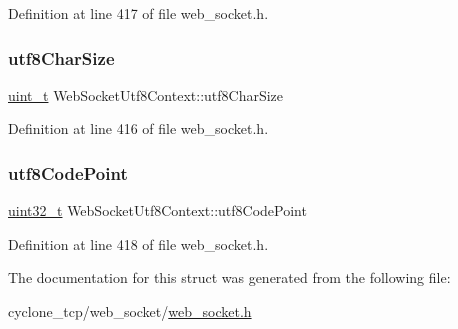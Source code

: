 Definition at line 417 of file web\+\_\+socket.\+h.

\mbox{\label{structWebSocketUtf8Context_a4a16550670061f8c363d4edb044238d0}} 
\subsubsection{\texorpdfstring{utf8\+Char\+Size}{utf8CharSize}}
{\footnotesize\ttfamily \hyperlink{compiler__port_8h_a12a1e9b3ce141648783a82445d02b58d}{uint\+\_\+t} Web\+Socket\+Utf8\+Context\+::utf8\+Char\+Size}



Definition at line 416 of file web\+\_\+socket.\+h.

\mbox{\label{structWebSocketUtf8Context_a9b49b73c1b03907044863848e71fe3d0}} 
\subsubsection{\texorpdfstring{utf8\+Code\+Point}{utf8CodePoint}}
{\footnotesize\ttfamily \hyperlink{stdint_8h_a435d1572bf3f880d55459d9805097f62}{uint32\+\_\+t} Web\+Socket\+Utf8\+Context\+::utf8\+Code\+Point}



Definition at line 418 of file web\+\_\+socket.\+h.



The documentation for this struct was generated from the following file\+:\begin{DoxyCompactItemize}
\item 
cyclone\+\_\+tcp/web\+\_\+socket/\hyperlink{web__socket_8h}{web\+\_\+socket.\+h}\end{DoxyCompactItemize}
